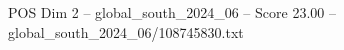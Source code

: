 \begin{textsample}{POS Dim 2 – global\_south\_2024\_06 – Score 23.00 – global\_south\_2024\_06/108745830.txt}
\end{textsample}
